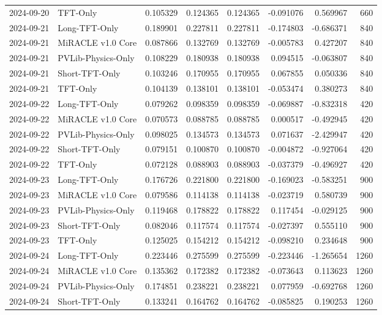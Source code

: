 \begin{tabular}{llrrrrrr}
2024-09-20 & TFT-Only & 0.105329 & 0.124365 & 0.124365 & -0.091076 & 0.569967 & 660 \\
2024-09-21 & Long-TFT-Only & 0.189901 & 0.227811 & 0.227811 & -0.174803 & -0.686371 & 840 \\
2024-09-21 & MiRACLE v1.0 Core & 0.087866 & 0.132769 & 0.132769 & -0.005783 & 0.427207 & 840 \\
2024-09-21 & PVLib-Physics-Only & 0.108229 & 0.180938 & 0.180938 & 0.094515 & -0.063807 & 840 \\
2024-09-21 & Short-TFT-Only & 0.103246 & 0.170955 & 0.170955 & 0.067855 & 0.050336 & 840 \\
2024-09-21 & TFT-Only & 0.104139 & 0.138101 & 0.138101 & -0.053474 & 0.380273 & 840 \\
2024-09-22 & Long-TFT-Only & 0.079262 & 0.098359 & 0.098359 & -0.069887 & -0.832318 & 420 \\
2024-09-22 & MiRACLE v1.0 Core & 0.070573 & 0.088785 & 0.088785 & 0.000517 & -0.492945 & 420 \\
2024-09-22 & PVLib-Physics-Only & 0.098025 & 0.134573 & 0.134573 & 0.071637 & -2.429947 & 420 \\
2024-09-22 & Short-TFT-Only & 0.079151 & 0.100870 & 0.100870 & -0.004872 & -0.927064 & 420 \\
2024-09-22 & TFT-Only & 0.072128 & 0.088903 & 0.088903 & -0.037379 & -0.496927 & 420 \\
2024-09-23 & Long-TFT-Only & 0.176726 & 0.221800 & 0.221800 & -0.169023 & -0.583251 & 900 \\
2024-09-23 & MiRACLE v1.0 Core & 0.079586 & 0.114138 & 0.114138 & -0.023719 & 0.580739 & 900 \\
2024-09-23 & PVLib-Physics-Only & 0.119468 & 0.178822 & 0.178822 & 0.117454 & -0.029125 & 900 \\
2024-09-23 & Short-TFT-Only & 0.082046 & 0.117574 & 0.117574 & -0.027397 & 0.555110 & 900 \\
2024-09-23 & TFT-Only & 0.125025 & 0.154212 & 0.154212 & -0.098210 & 0.234648 & 900 \\
2024-09-24 & Long-TFT-Only & 0.223446 & 0.275599 & 0.275599 & -0.223446 & -1.265654 & 1260 \\
2024-09-24 & MiRACLE v1.0 Core & 0.135362 & 0.172382 & 0.172382 & -0.073643 & 0.113623 & 1260 \\
2024-09-24 & PVLib-Physics-Only & 0.174851 & 0.238221 & 0.238221 & 0.077959 & -0.692768 & 1260 \\
2024-09-24 & Short-TFT-Only & 0.133241 & 0.164762 & 0.164762 & -0.085825 & 0.190253 & 1260 \\

\end{tabular}
